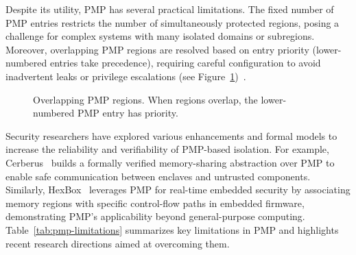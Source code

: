 Despite its utility, PMP has several practical limitations. The fixed number of PMP entries restricts the number of simultaneously protected regions, posing a challenge for complex systems with many isolated domains or subregions. Moreover, overlapping PMP regions are resolved based on entry priority (lower-numbered entries take precedence), requiring careful configuration to avoid inadvertent leaks or privilege escalations (see Figure~\ref{fig:pmp-priority})~\cite{riscvprivspec}.

\begin{figure}[htbp]
\centering
{}
\caption{Overlapping PMP regions. When regions overlap, the lower-numbered PMP entry has priority.}
\label{fig:pmp-priority}
\end{figure}


Security researchers have explored various enhancements and formal models to increase the reliability and verifiability of PMP-based isolation. For example, Cerberus~\cite{lee2022cerberus} builds a formally verified memory-sharing abstraction over PMP to enable safe communication between enclaves and untrusted components. Similarly, HexBox~\cite{hexbox2018} leverages PMP for real-time embedded security by associating memory regions with specific control-flow paths in embedded firmware, demonstrating PMP's applicability beyond general-purpose computing.
Table~\ref{tab:pmp-limitations} summarizes key limitations in PMP and highlights recent research directions aimed at overcoming them.

